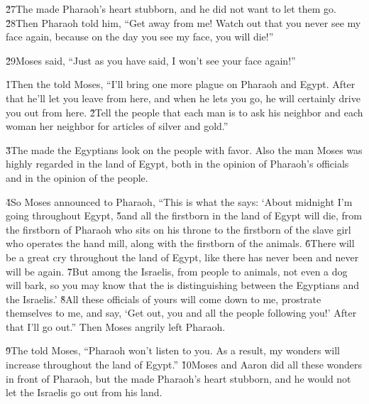 \v{27}The  made Pharaoh's heart stubborn, and he did not want to let them go. \v{28}Then Pharaoh told him, ``Get away from me! Watch out that you never see my face again, because on the day you see my face, you will die!''

\v{29}Moses said, ``Just as you have said, I won't see your face again!''

\v{1}Then the  told Moses, ``I'll bring one more plague on Pharaoh and Egypt. After that he'll let you leave from here, and when he lets you go, he will certainly drive you out from here. \v{2}Tell the people that each man is to ask his neighbor and each woman her neighbor for articles of silver and gold.''

\v{3}The  made the Egyptians look on the people with favor. Also the man Moses was highly regarded in the land of Egypt, both in the opinion of Pharaoh's officials and in the opinion of the people.

\v{4}So Moses announced to Pharaoh, ``This is what the  says: `About midnight I'm going throughout Egypt, \v{5}and all the firstborn in the land of Egypt will die, from the firstborn of Pharaoh who sits on his throne to the firstborn of the slave girl who operates the hand mill, along with the firstborn of the animals. \v{6}There will be a great cry throughout the land of Egypt, like there has never been and never will be again. \v{7}But among the Israelis, from people to animals, not even a dog will bark, so you may know that the  is distinguishing between the Egyptians and the Israelis.' \v{8}All these officials of yours will come down to me, prostrate themselves to me, and say, `Get out, you and all the people following you!' After that I'll go out.'' Then Moses angrily left Pharaoh.

\v{9}The  told Moses, ``Pharaoh won't listen to you. As a result, my wonders will increase throughout the land of Egypt.'' \v{10}Moses and Aaron did all these wonders in front of Pharaoh, but the  made Pharaoh's heart stubborn, and he would not let the Israelis go out from his land.


